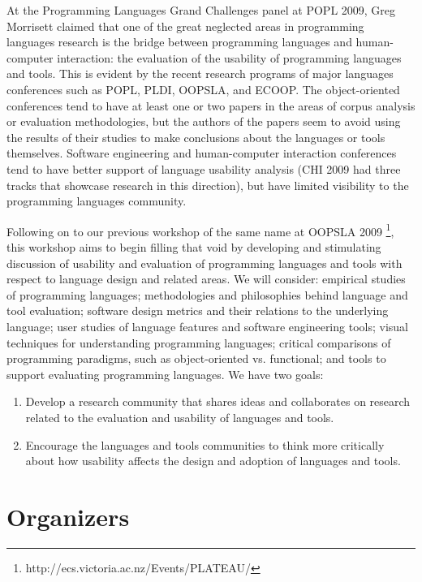 \documentclass[authorpermission]{sigplanconf}
\begin{document}
At the Programming Languages Grand Challenges panel at POPL 2009, Greg
Morrisett claimed that one of the great neglected areas in programming
languages research is the bridge between programming languages and
human-computer interaction: the evaluation of the usability of
programming languages and tools. This is evident by the recent
research programs of major languages conferences such as POPL, PLDI,
OOPSLA, and ECOOP. The object-oriented conferences tend to have at
least one or two papers in the areas of corpus analysis or evaluation
methodologies, but the authors of the papers seem to avoid using the
results of their studies to make conclusions about the languages or
tools themselves. Software engineering and human-computer interaction
conferences tend to have better support of language usability analysis
(CHI 2009 had three tracks that showcase research in this direction),
but have limited visibility to the programming languages community.

Following on to our previous workshop of the same name at OOPSLA 2009
\footnote{http://ecs.victoria.ac.nz/Events/PLATEAU/},
this workshop aims to begin filling that void by
developing and stimulating discussion of usability and evaluation of
programming languages and tools with respect to language design and
related areas. We will consider: empirical studies of programming
languages; methodologies and philosophies behind language and tool
evaluation; software design metrics and their relations to the
underlying language; user studies of language features and software
engineering tools; visual techniques for understanding programming
languages; critical comparisons of programming paradigms, such as
object-oriented vs. functional; and tools to support evaluating
programming languages. We have two goals:

\begin{enumerate}
  \item 
Develop a research community that shares ideas and collaborates on 
research related to the evaluation and usability of languages and tools.
\item
Encourage the languages and tools communities to think more critically
about how usability affects the  design and
adoption of languages and tools.
\end{enumerate}


\section{Organizers}
\end{document}
